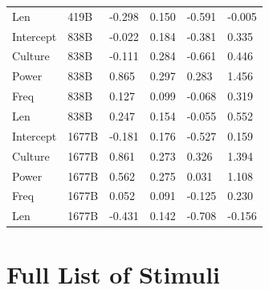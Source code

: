 \documentclass[
  12pt,
  letterpaper,
]{scrreprt}
\begin{document}
\begin{longtable}[]{@{}llllll@{}}
Len & 419B & -0.298 & 0.150 & -0.591 & -0.005 \\
Intercept & 838B & -0.022 & 0.184 & -0.381 & 0.335 \\
Culture & 838B & -0.111 & 0.284 & -0.661 & 0.446 \\
Power & 838B & 0.865 & 0.297 & 0.283 & 1.456 \\
Freq & 838B & 0.127 & 0.099 & -0.068 & 0.319 \\
Len & 838B & 0.247 & 0.154 & -0.055 & 0.552 \\
Intercept & 1677B & -0.181 & 0.176 & -0.527 & 0.159 \\
Culture & 1677B & 0.861 & 0.273 & 0.326 & 1.394 \\
Power & 1677B & 0.562 & 0.275 & 0.031 & 1.108 \\
Freq & 1677B & 0.052 & 0.091 & -0.125 & 0.230 \\
Len & 1677B & -0.431 & 0.142 & -0.708 & -0.156 \\

\end{longtable}

\chapter{Full List of Stimuli}\label{sec-full-list-of-stimuli}

\tiny
\end{document}
